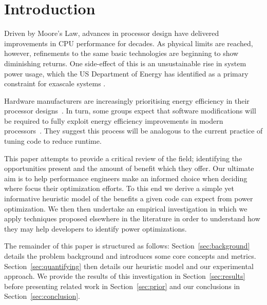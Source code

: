 \section*{Introduction \golden}
Driven by Moore's Law, advances in processor design have delivered improvements in CPU performance for decades. As physical limits are reached, however, refinements to the same basic technologies are beginning to show diminishing returns. One side-effect of this is an unsustainable rise in system power usage, which the US Department of Energy has identified as a primary constraint for exascale systems \cite{shalf:2011aa}. \golden

Hardware manufacturers are increasingly prioritising energy efficiency in their processor designs~\cite{kurd:2014aa}. In turn, some groups expect that software modifications will be required to fully exploit energy efficiency improvements in modern processors~\cite{shao:2013aa}. They suggest this process will be analogous to the current practice of tuning code to reduce runtime.




This paper attempts to provide a critical review of the field; identifying the opportunities present and the amount of benefit which they offer. Our ultimate aim is to help performance engineers make an informed choice when deciding where focus their optimization efforts. To this end we derive a simple yet informative heuristic model of the benefits a given code can expect from power optimization. We then then undertake an empirical investigation in which we apply techniques proposed elsewhere in the literature in order to understand how they may help developers to identify power optimizations.
 \golden

The remainder of this paper is structured as follows: Section~\ref{sec:background} details the problem background and introduces some core concepts and metrics. Section~\ref{sec:quantifying} then details our heuristic model and our experimental approach. We provide the results of this investigation in Section~\ref{sec:results} before presenting related work in Section~\ref{sec:prior} and our conclusions in Section~\ref{sec:conclusion}. \golden



